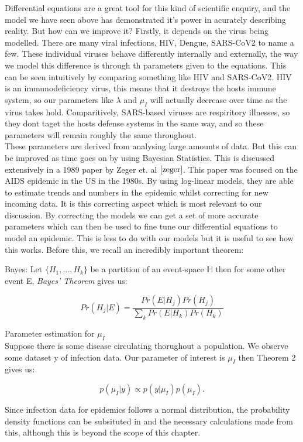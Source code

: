 Differential equations are a great tool for this kind of scientific enquiry, and the model we have seen above has demonstrated it's power in acurately describing reality. But how can we improve it? Firstly, it depends on the virus being modelled. There are many viral infections, HIV, Dengue, SARS-CoV2 to name a few. These individual viruses behave differently internally and externally, the way we model this difference is through th parameters given to the equations. This can be seen intuitively by comparing something like HIV and SARS-CoV2. HIV is an immunodeficiency virus, this means that it destroys the hosts immune system, so our parameters like $\lambda$ and  $\mu_I$ will actually decrease over time as the virus takes hold. Comparitively, SARS-based viruses are respiritory illnesses, so they dont taget the hosts defense systems in the same way, and so these parameters will remain roughly the same throughout. \\

These parameters are derived from analysing large amounts of data. But this can be improved as time goes on by using Bayesian Statistics. This is discussed extensively in a 1989 paper by Zeger et. al $\cite{zeger}$. This paper was focused on the AIDS epidemic in the US in the 1980s. By using log-linear models, they are able to estimate trends and numbers in the epidemic whilst correcting for new incoming data. It is this correcting aspect which is most relevant to our discussion. By correcting the models we can get a set of more accurate parameters which can then be used to fine tune our differential equations to model an epidemic. This is less to do with our models but it is useful to see how this works. Before this, we recall an incredibly important theorem:

\begin{theorem}{Bayes:}
Let $\{H_1,\ldots,H_k\}$ be a partition of an event-space $\mathbb{H}$ then for some other event E, \textit{Bayes' Theorem} gives us:

\begin{equation}        
    Pr(H_j | E) = \frac{Pr(E|H_j)Pr(H_j)}{\sum_k Pr(E|H_k)Pr(H_k)}
\end{equation}

\end{theorem}

\begin{example}{Parameter estimation for $\mu_I$} \\
    Suppose there is some disease circulating thorughout a population. We observe some dataset y of infection data. Our parameter of interest is $\mu_I$ then Theorem 2 gives us:

    \[
        p(\mu_I | y) \propto p(y|\mu_I)p(\mu_I)
    .\] 

Since infection data for epidemics follows a normal distribution, the probability density functions can be subsituted in and the necessary calculations made from this, although this is beyond the scope of this chapter.
\end{example}

